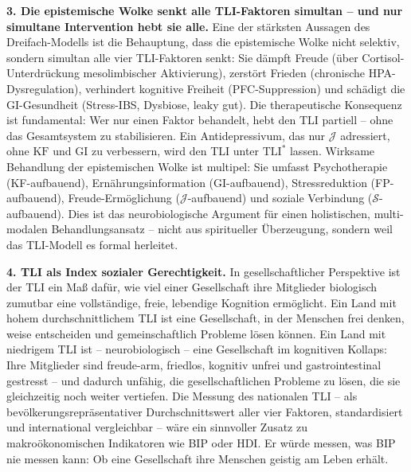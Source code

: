 ﻿\documentclass[12pt,a4paper]{report}
\theoremstyle{plain}
\theoremstyle{definition}
\theoremstyle{remark}
\begin{document}
	\textbf{3. Die epistemische Wolke senkt alle TLI-Faktoren simultan --
		und nur simultane Intervention hebt sie alle.}
	Eine der stärksten Aussagen des Dreifach-Modells ist die Behauptung,
	dass die epistemische Wolke nicht selektiv, sondern simultan
	alle vier TLI-Faktoren senkt:
	Sie dämpft Freude (über Cortisol-Unterdrückung mesolimbischer
	Aktivierung), zerstört Frieden (chronische HPA-Dysregulation),
	verhindert kognitive Freiheit (PFC-Suppression) und
	schädigt die GI-Gesundheit (Stress-IBS, Dysbiose, leaky gut).
	Die therapeutische Konsequenz ist fundamental: Wer nur einen
	Faktor behandelt, hebt den TLI partiell -- ohne
	das Gesamtsystem zu stabilisieren.
	Ein Antidepressivum, das nur $\mathcal{J}$ adressiert,
	ohne $\mathrm{KF}$ und $\mathrm{GI}$ zu verbessern,
	wird den TLI unter $\mathrm{TLI}^*$ lassen.
	Wirksame Behandlung der epistemischen Wolke ist multipel:
	Sie umfasst Psychotherapie (KF-aufbauend), Ernährungsinformation
	(GI-aufbauend), Stressreduktion (FP-aufbauend), Freude-Ermöglichung
	($ \mathcal{J}$-aufbauend) und soziale Verbindung ($\mathcal{S}$-aufbauend).
	Dies ist das neurobiologische Argument für einen holistischen,
	multi-modalen Behandlungsansatz -- nicht aus spiritueller
	Überzeugung, sondern weil das TLI-Modell es formal herleitet.

	\textbf{4. TLI als Index sozialer Gerechtigkeit.}
	In gesellschaftlicher Perspektive ist der TLI ein Maß dafür,
	wie viel einer Gesellschaft ihre Mitglieder biologisch zumutbar
	eine vollständige, freie, lebendige Kognition ermöglicht.
	Ein Land mit hohem durchschnittlichem TLI ist eine Gesellschaft,
	in der Menschen frei denken, weise entscheiden und
	gemeinschaftlich Probleme lösen können.
	Ein Land mit niedrigem TLI ist -- neurobiologisch -- eine
	Gesellschaft im kognitiven Kollaps: Ihre Mitglieder sind
	freude-arm, friedlos, kognitiv unfrei und gastrointestinal
	gestresst -- und dadurch unfähig, die gesellschaftlichen
	Probleme zu lösen, die sie gleichzeitig noch weiter vertiefen.
	Die Messung des nationalen TLI -- als bevölkerungs\-reprä\-sentativer
	Durchschnittswert aller vier Faktoren, standardisiert und
	international vergleichbar -- wäre ein sinnvoller Zusatz
	zu makroökonomischen Indikatoren wie BIP oder HDI.
	Er würde messen, was BIP nie messen kann:
	Ob eine Gesellschaft ihre Menschen geistig am Leben erhält.
\end{document}
